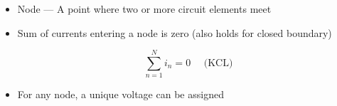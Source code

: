 \begin{itemize}
\begin{itemize}
      \item Node — A point where two or more circuit elements meet

      \item Sum of currents entering a node is zero (also holds for closed boundary)

        $$\boxed{\sum_{n=1}^N i_n=0\,\,\,\,\,\,\,\,\text{(KCL)}}$$

      \item For any node, a unique voltage can be assigned

    \end{itemize}

\end{itemize}




